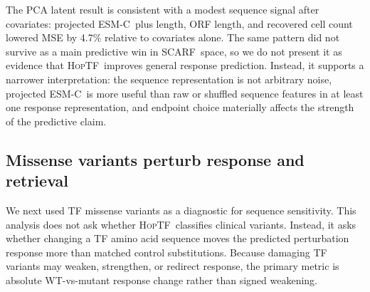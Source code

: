 \documentclass{article}
\newcommand{\hoptf}{\textsc{HopTF}}
\newcommand{\scarf}{\textsc{SCARF}}
\newcommand{\esm}{\textsc{ESM-C}}
\begin{document}
The PCA latent result is consistent with a modest sequence signal after covariates: projected \esm\ plus length, ORF length, and recovered cell count lowered MSE by 4.7\% relative to covariates alone. The same pattern did not survive as a main predictive win in \scarf\ space, so we do not present it as evidence that \hoptf\ improves general response prediction. Instead, it supports a narrower interpretation: the sequence representation is not arbitrary noise, projected \esm\ is more useful than raw or shuffled sequence features in at least one response representation, and endpoint choice materially affects the strength of the predictive claim.

\subsection{Missense variants perturb response and retrieval}

We next used TF missense variants as a diagnostic for sequence sensitivity. This analysis does not ask whether \hoptf\ classifies clinical variants. Instead, it asks whether changing a TF amino acid sequence moves the predicted perturbation response more than matched control substitutions. Because damaging TF variants may weaken, strengthen, or redirect response, the primary metric is absolute WT-vs-mutant response change rather than signed weakening.

\begin{table}[t]
\centering
\caption{\scarf\ matched variant validation. Positive paired differences mean pathogenic variants changed predicted perturbed cell state activity more than the matched control group.}
\label{tab:matched_variant_validation}
\end{table}
\end{document}
